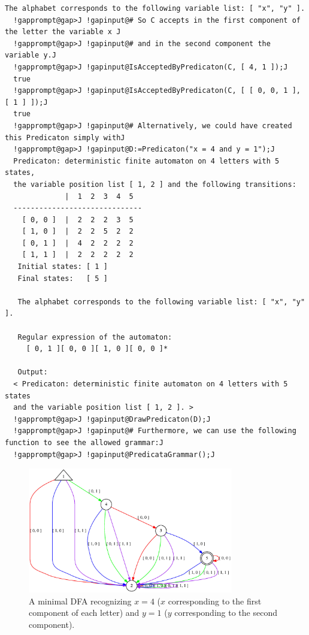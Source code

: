 \documentclass[a4paper,11pt]{report}
\begin{document}
{{{\begin{Verbatim}[commandchars=!@J,fontsize=\small,frame=single,label=Example]
   The alphabet corresponds to the following variable list: [ "x", "y" ].
  !gapprompt@gap>J !gapinput@# So C accepts in the first component of the letter the variable x J
  !gapprompt@gap>J !gapinput@# and in the second component the variable y.J
  !gapprompt@gap>J !gapinput@IsAcceptedByPredicaton(C, [ 4, 1 ]);J
  true
  !gapprompt@gap>J !gapinput@IsAcceptedByPredicaton(C, [ [ 0, 0, 1 ], [ 1 ] ]);J
  true
  !gapprompt@gap>J !gapinput@# Alternatively, we could have created this Predicaton simply withJ
  !gapprompt@gap>J !gapinput@D:=Predicaton("x = 4 and y = 1");J
  Predicaton: deterministic finite automaton on 4 letters with 5 states, 
  the variable position list [ 1, 2 ] and the following transitions:
              |  1  2  3  4  5  
  ------------------------------
    [ 0, 0 ]  |  2  2  2  3  5  
    [ 1, 0 ]  |  2  2  5  2  2  
    [ 0, 1 ]  |  4  2  2  2  2  
    [ 1, 1 ]  |  2  2  2  2  2  
   Initial states: [ 1 ]
   Final states:   [ 5 ]
  
   The alphabet corresponds to the following variable list: [ "x", "y" ].
  
   Regular expression of the automaton:
     [ 0, 1 ][ 0, 0 ][ 1, 0 ][ 0, 0 ]*
  
   Output:
  < Predicaton: deterministic finite automaton on 4 letters with 5 states 
  and the variable position list [ 1, 2 ]. >
  !gapprompt@gap>J !gapinput@DrawPredicaton(D);J
  !gapprompt@gap>J !gapinput@# Furthermore, we can use the following function to see the allowed grammar:J
  !gapprompt@gap>J !gapinput@PredicataGrammar();J
\end{Verbatim}
 
\begin{figure}[ht]
	\centering
  \includegraphics[width=0.8\textwidth]{img/ex1.jpg}
	\caption{A minimal DFA recognizing $x=4$ ($x$ corresponding to the first component of each letter) and $y=1$ ($y$ corresponding to the second component).}
	\label{ex1}
\end{figure}
  }

}}
\end{document}
